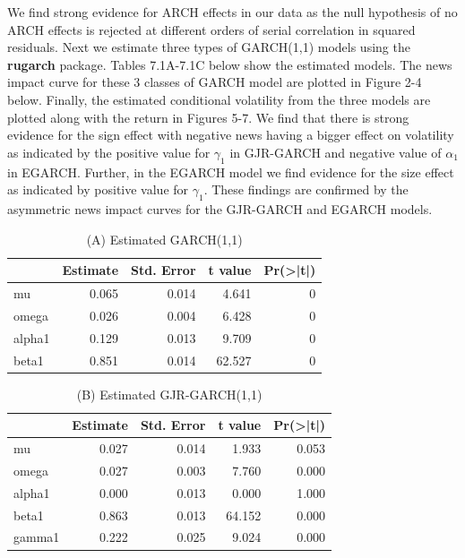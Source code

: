 \documentclass[]{book}
\theoremstyle{definition}
\theoremstyle{definition}
\theoremstyle{definition}
\theoremstyle{remark}
\begin{document}
We find strong evidence for ARCH effects in our data as the null
hypothesis of no ARCH effects is rejected at different orders of serial
correlation in squared residuals. Next we estimate three types of
GARCH(1,1) models using the \textbf{rugarch} package. Tables 7.1A-7.1C
below show the estimated models. The news impact curve for these 3
classes of GARCH model are plotted in Figure 2-4 below. Finally, the
estimated conditional volatility from the three models are plotted along
with the return in Figures 5-7. We find that there is strong evidence
for the sign effect with negative news having a bigger effect on
volatility as indicated by the positive value for \(\gamma_1\) in
GJR-GARCH and negative value of \(\alpha_1\) in EGARCH. Further, in the
EGARCH model we find evidence for the size effect as indicated by
positive value for \(\gamma_1\). These findings are confirmed by the
asymmetric news impact curves for the GJR-GARCH and EGARCH models.

\begin{table}

\caption{\label{tab:unnamed-chunk-11}(A) Estimated GARCH(1,1)}
\centering
\begin{tabular}[t]{l|r|r|r|r}
\hline
  &  Estimate &  Std. Error &  t value & Pr(>|t|)\\
\hline
mu & 0.065 & 0.014 & 4.641 & 0\\
\hline
omega & 0.026 & 0.004 & 6.428 & 0\\
\hline
alpha1 & 0.129 & 0.013 & 9.709 & 0\\
\hline
beta1 & 0.851 & 0.014 & 62.527 & 0\\
\hline
\end{tabular}
\end{table}

\begin{table}

\caption{\label{tab:unnamed-chunk-11}(B) Estimated GJR-GARCH(1,1)}
\centering
\begin{tabular}[t]{l|r|r|r|r}
\hline
  &  Estimate &  Std. Error &  t value & Pr(>|t|)\\
\hline
mu & 0.027 & 0.014 & 1.933 & 0.053\\
\hline
omega & 0.027 & 0.003 & 7.760 & 0.000\\
\hline
alpha1 & 0.000 & 0.013 & 0.000 & 1.000\\
\hline
beta1 & 0.863 & 0.013 & 64.152 & 0.000\\
\hline
gamma1 & 0.222 & 0.025 & 9.024 & 0.000\\
\hline
\end{tabular}
\end{table}
\end{document}
